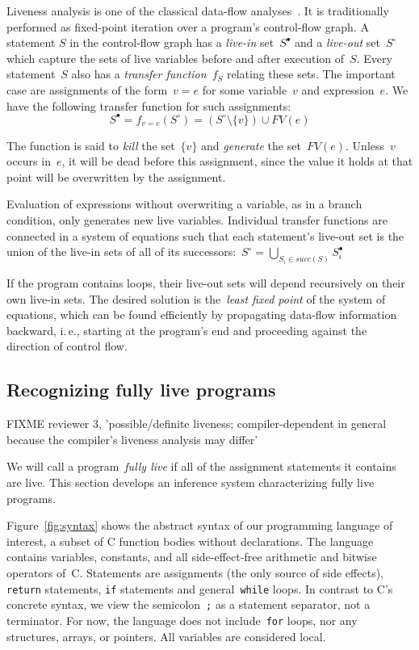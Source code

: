 \documentclass{llncs}
\newcommand{\liveout}[1]{\ensuremath{#1^{\circ}}}
\newcommand{\livein}[1]{\ensuremath{#1^{\bullet}}}
\def\union{\cup}
\begin{document}
Liveness analysis is one of the classical data-flow
analyses~\cite{nielson.etal-1999}. It is traditionally performed as
fixed-point iteration over a program's control-flow graph. A statement \(S\)
in the control-flow graph has a \emph{live-in} set~\(\livein{S}\) and a
\emph{live-out} set~\(\liveout{S}\) which capture the sets of live variables
before and after execution of~\(S\). Every statement~\(S\) also has a
\emph{transfer function}~\(f_S\) relating these sets. The important case are
assignments of the form~\(v = e\) for some variable~\(v\) and
expression~\(e\). We have the following transfer function for such
assignments:
\[
\livein{S} = f_{v = e}(\liveout{S})
           = (\liveout{S} \setminus \{v\}) \union FV(e)
\]

The function is said to \emph{kill} the set~\(\{v\}\) and \emph{generate}
the set~\(FV(e)\). Unless~\(v\) occurs in~\(e\), it will be dead before this
assignment, since the value it holds at that point will be overwritten by
the assignment.

Evaluation of expressions without overwriting a variable,
as in a branch condition, only generates new live variables. Individual
transfer functions are connected in a system of equations such that each
statement's live-out set is the union of the live-in sets of all of its
successors:~\(\liveout{S} = \bigcup_{S_i \in \mathit{succ}(S)}
\livein{S_i}\)

If the program contains loops, their live-out sets will depend recursively
on their own live-in sets. The desired solution is the~\emph{least fixed
point} of the system of equations, which can be found efficiently by
propagating data-flow information backward, i.\,e., starting at the
program's end and proceeding against the direction of control flow.


\subsection{Recognizing fully live programs}

FIXME reviewer 3, 'possible/definite liveness; compiler-dependent in general
because the compiler's liveness analysis may differ'

We will call a program~\emph{fully live} if all of the assignment statements
it contains are live. This section develops an inference system
characterizing fully live programs.

Figure~\ref{fig:syntax} shows the abstract syntax of our programming
language of interest, a subset of C function bodies without declarations.
The language contains variables, constants, and all side-effect-free
arithmetic and bitwise operators of~C. Statements are assignments (the only
source of side effects), \verb|return| statements, \verb|if| statements and
general~\verb|while| loops. In contrast to C's concrete syntax, we view the
semicolon~\verb|;| as a statement separator, not a terminator. For now, the
language does not include~\verb|for| loops, nor any structures, arrays, or
pointers. All variables are considered local.
\end{document}

